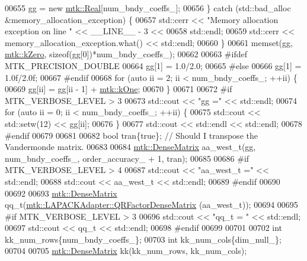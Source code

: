 \begin{DoxyCode}
{{00655     gg = \textcolor{keyword}{new} \hyperlink{group__c01-roots_gac080bbbf5cbb5502c9f00405f894857d}{mtk::Real}[num\_bndy\_coeffs\_];
00656   \} \textcolor{keywordflow}{catch} (std::bad\_alloc &memory\_allocation\_exception) \{
00657     std::cerr << \textcolor{stringliteral}{"Memory allocation exception on line "} << \_\_LINE\_\_ - 3 <<
00658       std::endl;
00659     std::cerr << memory\_allocation\_exception.what() << std::endl;
00660   \}
00661   memset(gg, \hyperlink{group__c01-roots_ga59a451a5fae30d59649bcda274fea271}{mtk::kZero}, \textcolor{keyword}{sizeof}(gg[0])*num\_bndy\_coeffs\_);
00662 
00663 \textcolor{preprocessor}{  #ifdef MTK\_PRECISION\_DOUBLE}
00664   gg[1] = 1.0/2.0;
00665 \textcolor{preprocessor}{  #else}
00666   gg[1] = 1.0f/2.0f;
00667 \textcolor{preprocessor}{  #endif}
00668   \textcolor{keywordflow}{for} (\textcolor{keyword}{auto} ii = 2; ii < num\_bndy\_coeffs\_; ++ii) \{
00669     gg[ii] = gg[ii - 1] + \hyperlink{group__c01-roots_ga26407c24d43b6b95480943340d285c71}{mtk::kOne};
00670   \}
00671 
00672 \textcolor{preprocessor}{  #if MTK\_VERBOSE\_LEVEL > 3}
00673   std::cout << \textcolor{stringliteral}{"gg ="} << std::endl;
00674   \textcolor{keywordflow}{for} (\textcolor{keyword}{auto} ii = 0; ii < num\_bndy\_coeffs\_; ++ii) \{
00675     std::cout << std::setw(12) << gg[ii];
00676   \}
00677   std::cout << std::endl << std::endl;
00678 \textcolor{preprocessor}{  #endif}
00679 
00681 
00682   \textcolor{keywordtype}{bool} tran\{\textcolor{keyword}{true}\}; \textcolor{comment}{// Should I transpose the Vandermonde matrix.}
00683 
00684   \hyperlink{classmtk_1_1DenseMatrix}{mtk::DenseMatrix} aa\_west\_t(gg, num\_bndy\_coeffs\_, order\_accuracy\_ + 1, tran);
00685 
00686 \textcolor{preprocessor}{  #if MTK\_VERBOSE\_LEVEL > 4}
00687   std::cout << \textcolor{stringliteral}{"aa\_west\_t ="} << std::endl;
00688   std::cout << aa\_west\_t << std::endl;
00689 \textcolor{preprocessor}{  #endif}
00690 
00692 
00693   \hyperlink{classmtk_1_1DenseMatrix}{mtk::DenseMatrix} qq\_t(\hyperlink{classmtk_1_1LAPACKAdapter_ae5c6e78c9c819c9ac7a6f31bfd011d7a}{mtk::LAPACKAdapter::QRFactorDenseMatrix}
      (aa\_west\_t));
00694 
00695 \textcolor{preprocessor}{  #if MTK\_VERBOSE\_LEVEL > 3}
00696   std::cout << \textcolor{stringliteral}{"qq\_t = "} << std::endl;
00697   std::cout << qq\_t << std::endl;
00698 \textcolor{preprocessor}{  #endif}
00699 
00701 
00702   \textcolor{keywordtype}{int} kk\_num\_rows\{num\_bndy\_coeffs\_\};
00703   \textcolor{keywordtype}{int} kk\_num\_cols\{dim\_null\_\};
00704 
00705   \hyperlink{classmtk_1_1DenseMatrix}{mtk::DenseMatrix} kk(kk\_num\_rows, kk\_num\_cols);
}}
\end{DoxyCode}
